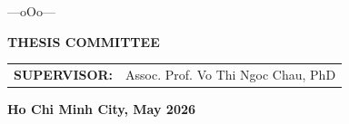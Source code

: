 \begin{titlepage}
\begin{center}
        \vspace{0.3cm}
        ---oOo---
        \vspace{0.3cm}

        \textbf{THESIS COMMITTEE}

        \vspace{0.25cm}
        \begin{tabular}{@{}rl@{}}
            \textbf{SUPERVISOR:} & Assoc. Prof. Vo Thi Ngoc Chau, PhD \\
        \end{tabular}
    \end{center}

    \vfill

    \begin{center}
        \textbf{Ho Chi Minh City, May 2026}
    \end{center}
\end{titlepage}
